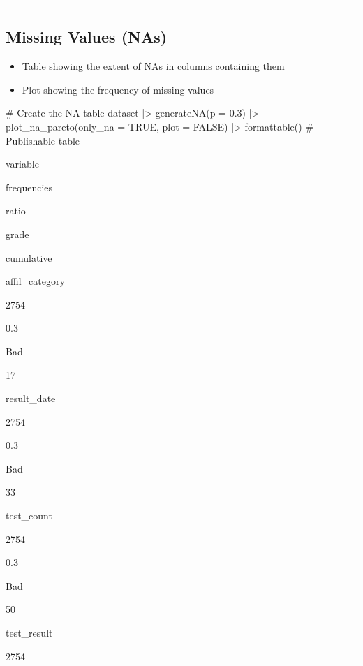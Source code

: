 \documentclass[
  letterpaper,
  DIV=11,
  numbers=noendperiod]{scrreprt}
\newenvironment{Shaded}{\begin{snugshade}}{\end{snugshade}}
\newcommand{\AttributeTok}[1]{\textcolor[rgb]{0.40,0.45,0.13}{#1}}
\newcommand{\CommentTok}[1]{\textcolor[rgb]{0.37,0.37,0.37}{#1}}
\newcommand{\ConstantTok}[1]{\textcolor[rgb]{0.56,0.35,0.01}{#1}}
\newcommand{\FloatTok}[1]{\textcolor[rgb]{0.68,0.00,0.00}{#1}}
\newcommand{\FunctionTok}[1]{\textcolor[rgb]{0.28,0.35,0.67}{#1}}
\newcommand{\NormalTok}[1]{\textcolor[rgb]{0.00,0.23,0.31}{#1}}
\newcommand{\SpecialCharTok}[1]{\textcolor[rgb]{0.37,0.37,0.37}{#1}}
\providecommand{\tightlist}{%
  \setlength{\itemsep}{0pt}\setlength{\parskip}{0pt}}\usepackage{longtable,booktabs,array}
\begin{document}
\begin{center}\rule{0.5\linewidth}{0.5pt}\end{center}

\hypertarget{missing-values-nas-1}{%
\subsection{Missing Values (NAs)}\label{missing-values-nas-1}}

\begin{itemize}
\tightlist
\item
  Table showing the extent of NAs in columns containing them
\item
  Plot showing the frequency of missing values
\end{itemize}

\begin{Shaded}
\begin{Highlighting}[]
\CommentTok{\# Create the NA table}
\NormalTok{dataset }\SpecialCharTok{|\textgreater{}}
  \FunctionTok{generateNA}\NormalTok{(}\AttributeTok{p =} \FloatTok{0.3}\NormalTok{) }\SpecialCharTok{|\textgreater{}}
  \FunctionTok{plot\_na\_pareto}\NormalTok{(}\AttributeTok{only\_na =} \ConstantTok{TRUE}\NormalTok{, }\AttributeTok{plot =} \ConstantTok{FALSE}\NormalTok{) }\SpecialCharTok{|\textgreater{}}
  \FunctionTok{formattable}\NormalTok{() }\CommentTok{\# Publishable table}
\end{Highlighting}
\end{Shaded}

variable

frequencies

ratio

grade

cumulative

affil\_category

2754

0.3

Bad

17

result\_date

2754

0.3

Bad

33

test\_count

2754

0.3

Bad

50

test\_result

2754
\end{document}
